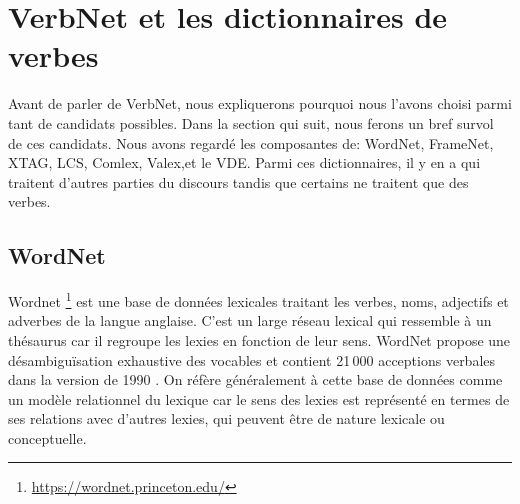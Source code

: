 
\chapter{VerbNet et les dictionnaires de verbes}

Avant de parler de VerbNet, nous expliquerons pourquoi nous l'avons choisi parmi tant de candidats possibles. Dans la section qui suit, nous ferons un bref survol de ces candidats. Nous avons regardé les composantes de: WordNet, FrameNet, XTAG, LCS, Comlex, Valex,et le VDE. Parmi ces dictionnaires, il y en a qui traitent d'autres parties du discours tandis que certains ne traitent que des verbes.


\section{WordNet}
Wordnet \citep{Fellbaum1998}\footnote{\url{https://wordnet.princeton.edu/}} est une base de données lexicales traitant les verbes, noms, adjectifs et adverbes de la langue anglaise. C'est un large réseau lexical qui ressemble à un thésaurus car il regroupe les lexies en fonction de leur sens. WordNet propose une désambiguïsation exhaustive des vocables et contient 21\,000 acceptions verbales dans la version de 1990 \citep{MillerWordNetonlinelexical1990}. On réfère généralement à cette base de données comme un modèle relationnel du lexique car le sens des lexies est représenté en termes de ses relations avec d'autres lexies, qui peuvent être de nature lexicale ou conceptuelle.



